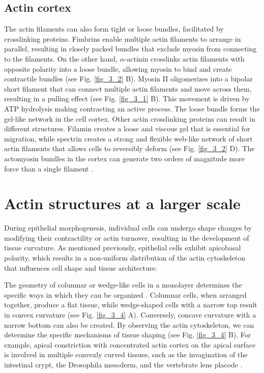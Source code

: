 \hypertarget{actin-cortex}{%
	\subsection{Actin cortex}\label{actin-cortex}}

The actin filaments can also form tight or loose bundles, facilitated by crosslinking proteins. Fimbrins enable multiple actin filaments to arrange in parallel, resulting in closely packed bundles that exclude myosin from connecting to the filaments. On the other hand, $\alpha$-actinin crosslinks actin filaments with opposite polarity into a loose bundle, allowing myosin to bind and create contractile bundles (see Fig. \ref{fig_3_2} B). Myosin II oligomerizes into a bipolar short filament that can connect multiple actin filaments and move across them, resulting in a pulling effect (see Fig. \ref{fig_3_1} B). This movement is driven by ATP hydrolysis making contracting an active process. The loose bundle forms the gel-like network in the cell cortex. Other actin crosslinking proteins can result in different structures. Filamin creates a loose and viscous gel that is essential for migration, while spectrin creates a strong and flexible web-like network of short actin filaments that allows cells to reversibly deform (see Fig. \ref{fig_3_2} D). The actomyosin bundles in the cortex can generate two orders of magnitude more force than a single filament \cite{clarke2021}.


\hypertarget{actin-structures-at-a-larger-scale}{%
\section{Actin structures at a larger scale}\label{actin-structures-at-a-larger-scale}}

During epithelial morphogenesis, individual cells can undergo shape changes by modifying their contractility or actin turnover, resulting in the development of tissue curvature. As mentioned previously, epithelial cells exhibit apicobasal polarity, which results in a non-uniform distribution of the actin cytoskeleton that influences cell shape and tissue architecture.

The geometry of columnar or wedge-like cells in a monolayer determines the specific ways in which they can be organized \cite{gomez-galvez2021}. Columnar cells, when arranged together, produce a flat tissue, while wedge-shaped cells with a narrow top result in convex curvature (see Fig. \ref{fig_3_4} A). Conversely, concave curvature with a narrow bottom can also be created. By observing the actin cytoskeleton, we can determine the specific mechanisms of tissue shaping (see Fig. \ref{fig_3_4} B). For example, apical constriction with concentrated actin cortex on the apical surface is involved in multiple convexly curved tissues, such as the invagination of the intestinal crypt, the Drosophila mesoderm, and the vertebrate lens placode \cite{perez-gonzalez2021, lecuit2011, houssin2020}.

